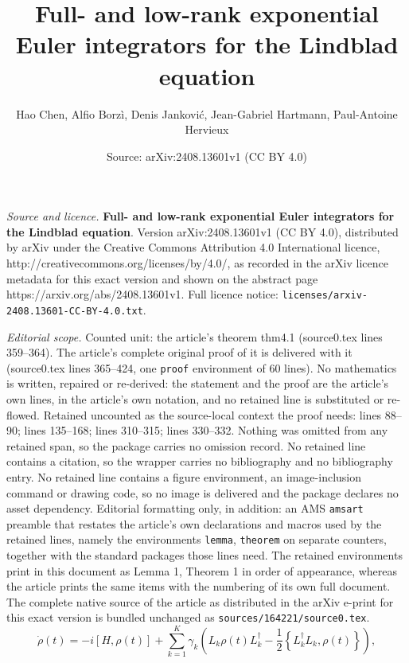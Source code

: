 \documentclass[10pt,a4paper]{amsart}
\title{\textbf{Full- and low-rank exponential Euler integrators for the Lindblad equation}}
\author{Hao Chen, Alfio Borz\`i, Denis Jankovi\'c, Jean-Gabriel Hartmann, Paul-Antoine Hervieux}
\date{Source: arXiv:2408.13601v1 (CC BY 4.0)}
\begin{document}
\maketitle

\noindent\emph{Source and licence.} \textbf{Full- and low-rank exponential Euler integrators for the Lindblad equation}. Version arXiv:2408.13601v1 (CC BY 4.0), distributed by arXiv under the Creative Commons Attribution 4.0 International licence, http://creativecommons.org/licenses/by/4.0/, as recorded in the arXiv licence metadata for this exact version and shown on the abstract page https://arxiv.org/abs/2408.13601v1. Full licence notice: \texttt{licenses/arxiv-2408.13601-CC-BY-4.0.txt}.\par\smallskip

\noindent\textit{Editorial scope.} Counted unit: the article's theorem thm4.1 (source0.tex lines 359--364). The article's complete original proof of it is delivered with it (source0.tex lines 365--424, one \texttt{proof} environment of 60 lines). No mathematics is written, repaired or re-derived: the statement and the proof are the article's own lines, in the article's own notation, and no retained line is substituted or re-flowed.  Retained uncounted as the source-local context the proof needs: lines 88--90; lines 135--168; lines 310--315; lines 330--332.  Nothing was omitted from any retained span, so the package carries no omission record.  No retained line contains a citation, so the wrapper carries no bibliography and no bibliography entry.  No retained line contains a figure environment, an image-inclusion command or drawing code, so no image is delivered and the package declares no asset dependency.  Editorial formatting only, in addition: an AMS \texttt{amsart} preamble that restates the article's own declarations and macros used by the retained lines, namely the environments \texttt{lemma}, \texttt{theorem} on separate counters, together with the standard packages those lines need.  The retained environments print in this document as Lemma 1, Theorem 1 in order of appearance, whereas the article prints the same items with the numbering of its own full document.  The complete native source of the article as distributed in the arXiv e-print for this exact version is bundled unchanged as \texttt{sources/164221/source0.tex}.
\begin{equation}\label{equ1.1}
  \dot{\rho}(t)=-i[H,\rho(t)]+\sum_{k=1}^K\gamma_k\left(L_k\rho(t) L_k^{\dag}-\frac{1}{2}\left\{L_k^{\dag}L_k,\rho(t)\right\}\right),
\end{equation}
\end{document}
